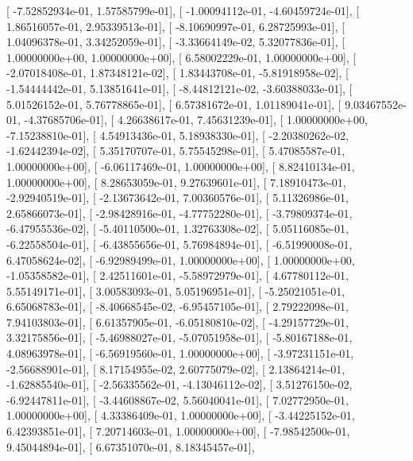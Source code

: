 \documentclass{article}
\begin{document}
       [ -7.52852934e-01,   1.57585799e-01],
       [ -1.00094112e-01,  -4.60459724e-01],
       [  1.86516057e-01,   2.95339513e-01],
       [ -8.10690997e-01,   6.28725993e-01],
       [  1.04096378e-01,   3.34252059e-01],
       [ -3.33664149e-02,   5.32077836e-01],
       [  1.00000000e+00,   1.00000000e+00],
       [  6.58002229e-01,   1.00000000e+00],
       [ -2.07018408e-01,   1.87348121e-02],
       [  1.83443708e-01,  -5.81918958e-02],
       [ -1.54444442e-01,   5.13851641e-01],
       [ -8.44812121e-02,  -3.60388033e-01],
       [  5.01526152e-01,   5.76778865e-01],
       [  6.57381672e-01,   1.01189041e-01],
       [  9.03467552e-01,  -4.37685706e-01],
       [  4.26638617e-01,   7.45631239e-01],
       [  1.00000000e+00,  -7.15238810e-01],
       [  4.54913436e-01,   5.18938330e-01],
       [ -2.20380262e-02,  -1.62442394e-02],
       [  5.35170707e-01,   5.75545298e-01],
       [  5.47085587e-01,   1.00000000e+00],
       [ -6.06117469e-01,   1.00000000e+00],
       [  8.82410134e-01,   1.00000000e+00],
       [  8.28653059e-01,   9.27639601e-01],
       [  7.18910473e-01,  -2.92940519e-01],
       [ -2.13673642e-01,   7.00360576e-01],
       [  5.11326986e-01,   2.65866073e-01],
       [ -2.98428916e-01,  -4.77752280e-01],
       [ -3.79809374e-01,  -6.47955536e-02],
       [ -5.40110500e-01,   1.32763308e-02],
       [  5.05116085e-01,  -6.22558504e-01],
       [ -6.43855656e-01,   5.76984894e-01],
       [ -6.51990008e-01,   6.47058624e-02],
       [ -6.92989499e-01,   1.00000000e+00],
       [  1.00000000e+00,  -1.05358582e-01],
       [  2.42511601e-01,  -5.58972979e-01],
       [  4.67780112e-01,   5.55149171e-01],
       [  3.00583093e-01,   5.05196951e-01],
       [ -5.25021051e-01,   6.65068783e-01],
       [ -8.40668545e-02,  -6.95457105e-01],
       [  2.79222098e-01,   7.94103803e-01],
       [  6.61357905e-01,  -6.05180810e-02],
       [ -4.29157729e-01,   3.32175856e-01],
       [ -5.46988027e-01,  -5.07051958e-01],
       [ -5.80167188e-01,   4.08963978e-01],
       [ -6.56919560e-01,   1.00000000e+00],
       [ -3.97231151e-01,  -2.56688901e-01],
       [  8.17154955e-02,   2.60775079e-02],
       [  2.13864214e-01,  -1.62885540e-01],
       [ -2.56335562e-01,  -4.13046112e-02],
       [  3.51276150e-02,  -6.92447811e-01],
       [ -3.44608867e-02,   5.56040041e-01],
       [  7.02772950e-01,   1.00000000e+00],
       [  4.33386409e-01,   1.00000000e+00],
       [ -3.44225152e-01,   6.42393851e-01],
       [  7.20714603e-01,   1.00000000e+00],
       [ -7.98542500e-01,   9.45044894e-01],
       [  6.67351070e-01,   8.18345457e-01],
\end{document}
